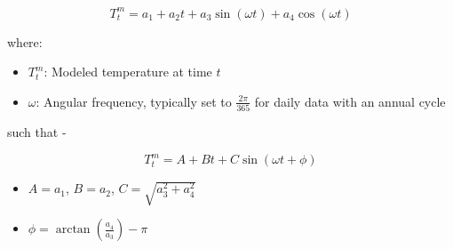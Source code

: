 \documentclass{article}
\begin{document}
\[
T_t^{m} = a_1 + a_2 t + a_3 \sin(\omega t) + a_4 \cos(\omega t)
\]

where:
\begin{itemize}
    \item \( T_t^{m} \): Modeled temperature at time \( t \)
    \item \( \omega \): Angular frequency, typically set to \( \frac{2\pi}{365} \) for daily data with an annual cycle
\end{itemize}

such that - 

\[
T_t^{m} = A + B t + C \sin(\omega t + \phi)
\]

\begin{itemize}
    \item \( A = a_1 \), \( B = a_2 \), \( C = \sqrt{a_3^2 + a_4^2} \)
    \item \( \phi = \arctan\left(\frac{a_4}{a_3}\right) - \pi \)
\end{itemize}
\end{document}
